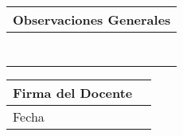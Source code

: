 \documentclass[12pt]{article}
\numberwithin{equation}{section}
\numberwithin{figure}{section}
\numberwithin{table}{section}
\begin{document}
\begin{titlepage}
\begin{center}
        \vfill

        \begin{tabular}{|p{}|}
            \hline \vfill
            Observaciones Generales
            \\[6pt] \hline
            \\[12pt] \hline
            \\[12pt] \hline
            \\[12pt] \hline
            \\[12pt] \hline
            \\[12pt] \hline
            \\[12pt] \hline
            \\[12pt] \hline
        \end{tabular}

        \vfill

        \begin{tabular}{|p{}|p{}|}
            \hline
            \vfill Firma del Docente \vfill & \\[48pt]
            \hline
            \vfill Fecha \vfill & \\[6pt]
            \hline
        \end{tabular}

    \end{center}

\end{titlepage}

\setcounter{page}{1}

\ifx \indice \undefined
\else
    \tableofcontents
    \newpage
\fi




\newcommand{\figuregraph}[3]{
    \begin{figure}[H]
        \center
        \texttt{[image: \#2]}
        \caption{#3}\label{#2}
    \end{figure}
}

\newcommand{\twofigures}[6]{
    \begin{figure}[H]
        \minipage{0.5\textwidth}
            \center
            \texttt{[image: \#2]}
            \caption{#3}\label{#2}
        \endminipage
        \minipage{0.5\textwidth}
            \center
            \texttt{[image: \#5]}
            \caption{#6}\label{#5}
        \endminipage
    \end{figure}
}



\end{document}
